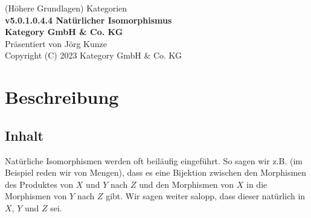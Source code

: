 \documentclass[a4paper]{amsart}
\theoremstyle{definition}
\begin{document}
\begin{titlepage}
\centering
{\huge
(Höhere Grundlagen) Kategorien\\[1cm]
\textbf{v5.0.1.0.4.4 Natürlicher Isomorphismus}
}\\[1cm]

\textbf{Kategory GmbH \& Co. KG}\\
Präsentiert von Jörg Kunze\\
Copyright (C) 2023 Kategory GmbH \& Co. KG

\end{titlepage}

%

\newpage

\section*{Beschreibung}

\subsection*{Inhalt}
Natürliche Isomorphismen werden oft beiläufig eingeführt. So sagen wir z.B. (im Beispiel reden wir von Mengen), dass es eine Bijektion zwischen den Morphismen des Produktes von $X$ und $Y$ nach $Z$ und den Morphismen von $X$ in die Morphismen von $Y$ nach $Z$ gibt. Wir sagen weiter salopp, dass dieser natürlich in $X$, $Y$ und $Z$ sei.
\end{document}
